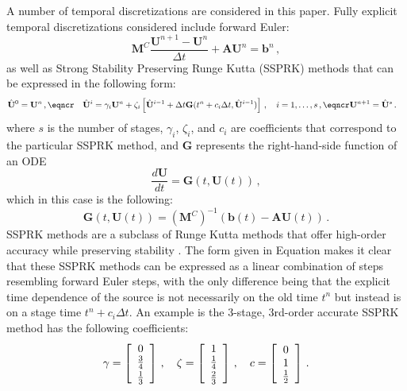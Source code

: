 \documentclass[xchauthor,chkrefs,fixeqskip,GCNS,amsmath,amsthm]{yjcphg}
\theoremstyle{remark}
\begin{document}
A number of temporal discretizations are considered in this paper. Fully
explicit temporal discretizations considered include forward Euler:
%
\begin{equation}
\mathbf{M}^{C}\frac{\mathbf{U}^{n+1}-\mathbf{U}^{n}}{\Delta t} +
\mathbf{A}\mathbf{U}^{n} = \mathbf{b}^{n} \,,
\end{equation}
%
as well as Strong Stability Preserving Runge Kutta (SSPRK) methods that
can be expressed in the following form:
%
\begin{subequations}
\label{eq:ssprk}
%
\begin{align}
& \hat{\mathbf{U}}^{0} = \mathbf{U}^{n} \,,
\eqncr
& \hat{\mathbf{U}}^{i} = \gamma_{i} \mathbf{U}^{n} + \zeta_{i}
\left[
\hat{\mathbf{U}}^{i-1}
+ \Delta t\mathbf{G}(t^{n}+c_{i}\Delta t,
\hat{\mathbf{U}}^{i-1})\right]
\,,\quad i = 1,\ldots,s
\,,
\eqncr
& \mathbf{U}^{n+1} = \hat{\mathbf{U}}^{s} \,.
\end{align}
%
\end{subequations}
%
where $s$ is the number of stages, $\gamma_{i}$, $\zeta_{i}$, and
$c_{i}$ are coefficients that correspond to the particular SSPRK method,
and $\mathbf{G}$ represents the right-hand-side function of an ODE
%
\begin{equation}
\frac{d\mathbf{U}}{dt} = \mathbf{G}(t,\mathbf{U}(t)) \,,
\end{equation}
%
which in this case is the following:
%
\begin{equation}
\mathbf{G}(t,\mathbf{U}(t)) = (\mathbf{M}^{C})^{-1}
\left( \mathbf{b}(t)
- \mathbf{A}\mathbf{U}(t)\right) \,.
\end{equation}
%
SSPRK methods are a subclass of Runge Kutta methods that offer
high-order accuracy while preserving stability
\cite{gottlieb,macdonald}. The form given in Equation  makes it clear that these SSPRK methods can be
expressed as a linear combination of steps resembling forward Euler
steps, with the only difference being that the explicit time dependence
of the source is not necessarily on the old time $t^{n}$ but instead is
on a stage time $t^{n} + c_{i}\Delta t$. An example is the 3-stage,
3rd-order accurate SSPRK method has the following coefficients:
%
\begin{equation}
\gamma= \left[
%
\begin{array}{c}
0
\\
\frac{3}{4}
\cr \noalign{\vspace{2pt}}
\frac{1}{3}
\end{array}
%
\right]
\,,\quad\zeta= \left[
%
\begin{array}{c}
1
\\
\frac{1}{4}
\cr \noalign{\vspace{2pt}}
\frac{2}{3}
\end{array}
%
\right]
\,,\quad c = \left[
%
\begin{array}{c}
0
\\
1
\\
\frac{1}{2}
\end{array}
%
\right] \,.
\end{equation}
\end{document}
